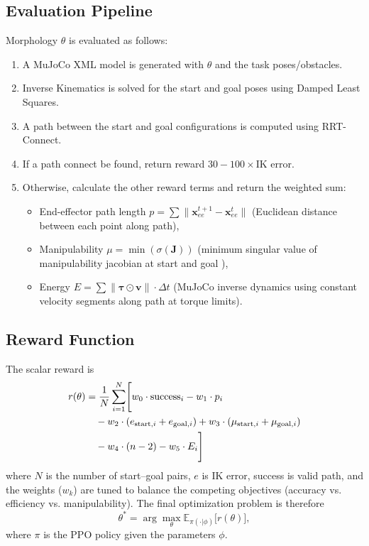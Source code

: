 \documentclass[letterpaper, 10 pt, conference]{ieeeconf}  %
\begin{document}
\subsection{Evaluation Pipeline}

Morphology $\theta$ is evaluated as follows:
\begin{enumerate}
    \item A MuJoCo XML model is generated with $\theta$ and the task poses/obstacles.
    \item Inverse Kinematics is solved for the start and goal poses using Damped Least Squares.
    \item A path between the start and goal configurations is computed using RRT-Connect.
    \item If a path connect be found, return reward $30 - 100 \times \text{IK error}$.
    \item Otherwise, calculate the other reward terms and return the weighted sum:
    \begin{itemize}
        \item End-effector path length $p = \sum \|\mathbf{x}_{ee}^{t+1} - \mathbf{x}_{ee}^t\|$ (Euclidean distance between each point along path),
        \item Manipulability $\mu = \min(\sigma(\mathbf{J}))$ (minimum singular value of manipulability jacobian at start and goal \cite{klein1987dexterity}),
        \item Energy $E = \sum \|\boldsymbol{\tau} \odot \mathbf{v}\| \cdot \Delta t$ (MuJoCo inverse dynamics using constant velocity segments along path at torque limits).
    \end{itemize}
\end{enumerate}

\subsection{Reward Function}

The scalar reward is
\begin{align}
r(\theta) &= \frac{1}{N} \sum_{i=1}^{N} \Biggl[ 
    w_0 \cdot \text{success}_i 
    - w_1 \cdot p_i \notag \\
    &\quad - w_2 \cdot (e_{\text{start},i} + e_{\text{goal},i}) 
    + w_3 \cdot (\mu_{\text{start},i} + \mu_{\text{goal},i}) \notag \\
    &\quad - w_4 \cdot (n - 2) 
    - w_5 \cdot E_i 
\Biggr]
\label{eq:reward}
\end{align}
where $N$ is the number of start–goal pairs, $e$ is IK error, success is valid path, and the weights ($w_k$) are tuned to balance the competing objectives (accuracy vs. efficiency vs. manipulability). 
The final optimization problem is therefore
\[
\theta^* = \arg\max_{\theta} \mathbb{E}_{\pi(\cdot|\phi)} \bigl[ r(\theta) \bigr],
\]
where $\pi$ is the PPO policy given the parameters $\phi$.
\end{document}
